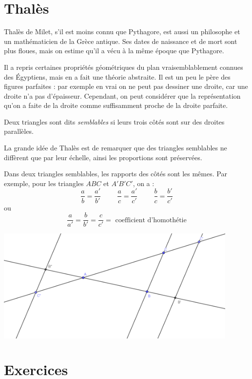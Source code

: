 \section{Thalès}

Thalès de Milet, s'il est moins connu que Pythagore, est aussi un philosophe et un mathématicien de la Grèce antique. Ses dates de naissance et de mort sont plus floues, mais on estime qu'il a vécu à la même époque que Pythagore.

Il a repris certaines propriétés géométriques du plan vraisemblablement connues des Égyptiens, mais en a fait une théorie abstraite. Il est un peu le père des figures parfaites : par exemple en vrai on ne peut pas dessiner une droite, car une droite n'a pas d'épaisseur. Cependant, on peut considérer que la représentation qu'on a faite de la droite comme suffisamment proche de la droite parfaite.

\begin{definition}
Deux triangles sont dits \emph{semblables} si leurs trois côtés sont sur des droites parallèles.
\end{definition}

La grande idée de Thalès est de remarquer que des triangles semblables ne diffèrent que par leur échelle, ainsi les proportions sont préservées.

\begin{theoreme}
Dans deux triangles semblables, les rapports des côtés sont les mêmes. Par exemple, pour les triangles $ABC$ et $A'B'C'$, on a :
$$
\frac{a}{b} = \frac{a'}{b'}\hspace{1cm} \frac{a}{c} = \frac{a'}{c'} \hspace{1cm} \frac{b}{c} = \frac{b'}{c'}
$$
ou
$$
\frac{a}{a'} = \frac{b}{b'} = \frac{c}{c'} = \mbox{ coefficient d'homothétie}
$$
\end{theoreme}

\begin{center}
\includegraphics[width=0.9\textwidth]{triangle/image/thales.png}
\end{center}

\section{Exercices}

